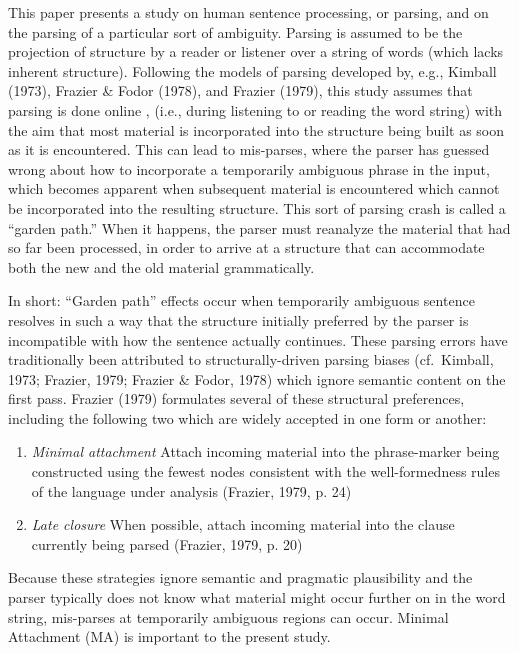 \documentclass[11pt,oneside]{book}
\begin{document}
\setlength\parindent{24pt}\setlength{\parskip}{0.0pt plus 1.0pt}

This paper presents a study on human sentence processing, or parsing, and on the parsing of a particular sort of ambiguity. Parsing is assumed to be the projection of structure by a reader or listener over a string of words (which lacks inherent structure). Following the models of parsing developed by, e.g., Kimball (1973), Frazier \& Fodor (1978), and Frazier (1979), this study assumes that parsing is done online , (i.e., during listening to or reading the word string) with the aim that most material is incorporated into the structure being built as soon as it is encountered. This can lead to mis-parses, where the parser has guessed wrong about how to incorporate a temporarily ambiguous phrase in the input, which becomes apparent when subsequent material is encountered which cannot be incorporated into the resulting structure. This sort of parsing crash is called a ``garden path.'' When it happens, the parser must reanalyze the material that had so far been processed, in order to arrive at a structure that can accommodate both the new and the old material grammatically.

In short: ``Garden path'' effects occur when temporarily ambiguous sentence resolves in such a way that the structure initially preferred by the parser is incompatible with how the sentence actually continues. These parsing errors have traditionally been attributed to structurally-driven parsing biases (cf.~Kimball, 1973; Frazier, 1979; Frazier \& Fodor, 1978) which ignore semantic content on the first pass. Frazier (1979) formulates several of these structural preferences, including the following two which are widely accepted in one form or another:

\begin{enumerate}
\def\labelenumi{(\arabic{enumi})}
\item
  \emph{Minimal attachment} \linebreak\nopagebreak
  Attach incoming material into the phrase-marker being constructed using the fewest nodes consistent with the well-formedness rules of the language under analysis (Frazier, 1979, p. 24)
\item
  \emph{Late closure} \linebreak\nopagebreak
  When possible, attach incoming material into the clause currently being parsed (Frazier, 1979, p. 20)
\end{enumerate}

Because these strategies ignore semantic and pragmatic plausibility and the parser typically does not know what material might occur further on in the word string, mis-parses at temporarily ambiguous regions can occur. Minimal Attachment (MA) is important to the present study.
\end{document}

